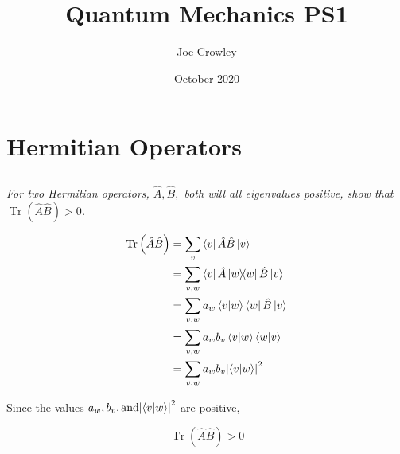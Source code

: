 \documentclass[12pt, letterpaper]{article}
\title{Quantum Mechanics PS1}
\author{Joe Crowley}
\date{October 2020}
\begin{document}
  

\section{Hermitian Operators}
\subsection{}
\textit{For two Hermitian operators, $\hat{A}, \hat{B},$ both will all eigenvalues positive, show that $\operatorname{Tr}(\hat{A} \hat{B})>0$. }

\begin{equation*}
\begin{split}
    \operatorname{Tr}\left(\hat{A}\hat{B}\right) &= \sum_v \bra{v}\hat{A}\hat{B}\ket{v}\\
    &= \sum_{v,w} \bra{v}\hat{A}\ketbra{w}\hat{B}\ket{v}\\
    &= \sum_{v,w} a_w\braket{v}{w}\bra{w}\hat{B}\ket{v}\\
    &= \sum_{v,w}  a_w b_v\braket{v}{w}\braket{w}{v}\\
    &= \sum_{v,w}  a_w b_v{\left|\braket{v}{w}\right| }^2
\end{split}
\end{equation*}

Since the values $ a_w, b_v, \text{and} {\left|\braket{v}{w}\right| }^2$ are positive, 

$$
    \operatorname{Tr}\left(\hat{A}\hat{B}\right) >0
$$
\end{document}
